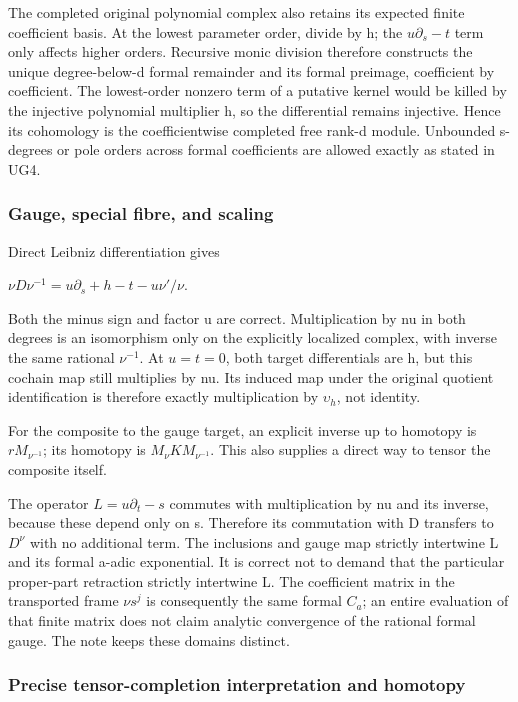 The completed original polynomial complex also retains its expected finite coefficient basis. At the lowest parameter order, divide by h; the \(u\partial_s-t\) term only affects higher orders. Recursive monic division therefore constructs the unique degree-below-d formal remainder and its formal preimage, coefficient by coefficient. The lowest-order nonzero term of a putative kernel would be killed by the injective polynomial multiplier h, so the differential remains injective. Hence its cohomology is the coefficientwise completed free rank-d module. Unbounded s-degrees or pole orders across formal coefficients are allowed exactly as stated in UG4.

\subsubsection{Gauge, special fibre, and scaling}\label{endpoint-f1_unit_gauge_review--gauge-special-fibre-and-scaling}

Direct Leibniz differentiation gives

\(\nu D\nu^{-1}=u\partial_s+h-t-u\nu'/\nu\).

Both the minus sign and factor u are correct. Multiplication by nu in both degrees is an isomorphism only on the explicitly localized complex, with inverse the same rational \(\nu^{-1}\). At \(u=t=0\), both target differentials are h, but this cochain map still multiplies by nu. Its induced map under the original quotient identification is therefore exactly multiplication by \(\upsilon_h\), not identity.

For the composite to the gauge target, an explicit inverse up to homotopy is \(r M_{\nu^{-1}}\); its homotopy is \(M_\nu K M_{\nu^{-1}}\). This also supplies a direct way to tensor the composite itself.

The operator \(L=u\partial_t-s\) commutes with multiplication by nu and its inverse, because these depend only on s. Therefore its commutation with D transfers to \(D^\nu\) with no additional term. The inclusions and gauge map strictly intertwine L and its formal a-adic exponential. It is correct not to demand that the particular proper-part retraction strictly intertwine L. The coefficient matrix in the transported frame \(\nu s^j\) is consequently the same formal \(C_a\); an entire evaluation of that finite matrix does not claim analytic convergence of the rational formal gauge. The note keeps these domains distinct.

\subsubsection{Precise tensor-completion interpretation and homotopy}\label{endpoint-f1_unit_gauge_review--precise-tensor-completion-interpretation-and-homotopy}

